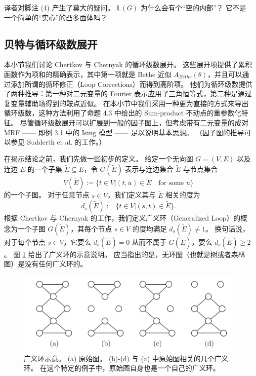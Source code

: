 \begin{note}
    译者对脚注 (4) 产生了莫大的疑问。
    $\mathbb{L}(G)$ 为什么会有个“空的内部”？
    它不是一个简单的“实心”的凸多面体吗？
\end{note}

\subsection{贝特与循环级数展开}

本小节我们讨论 Chertkov 与 Chernyak 的循环级数展开。
这些展开项提供了累积函数作为项和的精确表示，其中第一项就是 Bethe 近似 $A_{Bethe}(\theta)$，并且可以通过添加所谓的循环修正（Loop Corrections）而得到高阶项。
他们为循环级数提供了两种推导：第一种对二元变量的 Fourier 表示应用了三角恒等式，第二种是通过复变量辅助场得到的鞍点近似。
在本小节中我们采用一种更为直接的方式来导出循环级数，这种方法利用了命题 4.3 中给出的 Sum-product 不动点的重参数化特征。
尽管循环级数展开可以扩展到一般的因子图上，但考虑带有二元变量的成对 MRF —— 即例 3.1 中的 Ising 模型 —— 足以说明基本思想。
（因子图的推导可以参见 Sudderth et al. 的工作。）

在揭示结论之前，我们先做一些初步的定义。
给定一个无向图 $G = (V, E)$ 以及连边 $E$ 的一个子集 $\tilde{E} \subseteq E$，令 $G(\tilde{E})$ 表示与连边集合 $\tilde{E}$ 与节点集合
\begin{equation}
    V(\tilde{E}) := \{t \in V| (t, u) \in \tilde{E} \quad \text{for some } u\}
\end{equation}
的一个子图。
对于任意节点 $s \in V$，我们定义其与 $\tilde{E}$ 相关的度为
\begin{equation}
    d_s(\tilde{E}) := \{t \in V| (s, t) \in \tilde{E}\}.
\end{equation}
根据 Chertkov 与 Chernyak 的工作，我们定义广义环（Generalized Loop）的概念为一个子图 $G(\tilde{E})$，其每个节点 $s \in V$ 的度均满足 $d_s(\tilde{E}) \neq 1$。
换句话说，对于每个节点 $s \in V$，它要么 $d_s(\tilde{E}) = 0$ 从而不属于 $G(\tilde{E})$，要么 $d_s(\tilde{E}) \geq 2$。
图 \ref{fig:4-3} 给出了广义环的示意说明。
应当指出的是，无环图（也就是树或者森林图）是没有任何广义环的。

\begin{figure}[htbp]
    \centering
    \includegraphics[width=.9\linewidth]{figure/4-3.PNG}
    \caption{
        广义环示意。
        (a) 原始图。
        (b)-(d) 与 (a) 中原始图相关的几个广义环。
        在这个特定的例子中，原始图自身也是一个自己的广义环。
    }\label{fig:4-3}
\end{figure}

